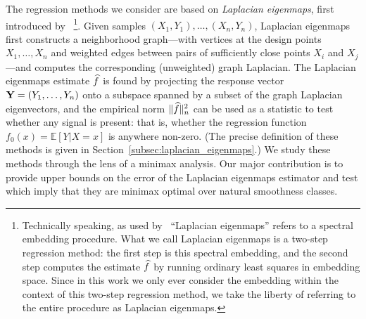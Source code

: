 The regression methods we consider are based on \emph{Laplacian eigenmaps}, first introduced by~\cite{belkin03a} \footnote{Technically speaking, as used by~\cite{belkin03a} ``Laplacian eigenmaps'' refers to a spectral embedding procedure. What we call Laplacian eigenmaps is a two-step regression method: the first step is this spectral embedding, and the second step computes the estimate $\widehat{f}$ by running ordinary least squares in embedding space.  Since in this work we only ever consider the embedding within the context of this two-step regression method, we take the liberty of referring to the entire procedure as Laplacian eigenmaps.}. Given samples $(X_1,Y_1),\ldots,(X_n,Y_n)$, Laplacian eigenmaps first constructs a neighborhood graph---with vertices at the design points $X_1,\ldots,X_n$ and weighted edges between pairs of sufficiently close points $X_i$ and $X_j$---and computes the corresponding (unweighted) graph Laplacian. The Laplacian eigenmaps estimate $\widehat{f}$ is found by projecting the response vector ${\bf Y} = (Y_1,\ldots,Y_n)$ onto a subspace spanned by a subset of the graph Laplacian eigenvectors, and the empirical norm $\|\widehat{f}\|_n^2$ can be used as a statistic to test whether any signal is present: that is, whether the regression function $f_0(x) = \mathbb{E}[Y|X = x]$ is anywhere non-zero. (The precise definition of these methods is given in Section~\ref{subsec:laplacian_eigenmaps}.) We study these methods through the lens of a minimax analysis. Our major contribution is to provide upper bounds on the error of the Laplacian eigenmaps estimator and test which imply that they are minimax optimal over natural smoothness classes.

